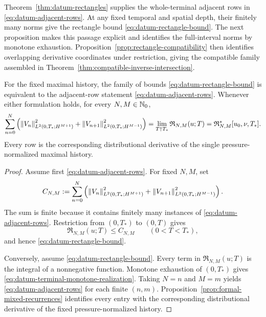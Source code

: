 Theorem~\ref{thm:datum-rectangles} supplies the whole-terminal adjacent
rows in \eqref{eq:datum-adjacent-rows}.  At any fixed temporal and spatial
depth, their finitely many norms give the rectangle bound
\eqref{eq:datum-rectangle-bound}.  The next proposition makes this passage
explicit and identifies the full-interval norms by monotone exhaustion.
Proposition~\ref{prop:rectangle-compatibility} then identifies overlapping
derivative coordinates under restriction, giving the compatible family
assembled in Theorem~\ref{thm:compatible-inverse-intersection}.

\begin{proposition}
\label{prop:datum-terminal-realization}
For the fixed maximal history, the family of bounds
\eqref{eq:datum-rectangle-bound} is equivalent to the adjacent-row statement
\eqref{eq:datum-adjacent-rows}.  Whenever either formulation holds, for every
\(N,M\in\mathbb N_0\),
\begin{equation}
 \sum_{n=0}^{N}\left(
 \left\lVert V_n\right\rVert_{L^2(0,T_*;H^{M+1})}^2
 +\left\lVert V_{n+1}\right\rVert_{L^2(0,T_*;H^{M-1})}^2
 \right)
 =\lim_{T\uparrow T_*}\mathfrak R_{N,M}(u;T)
 =\mathfrak R_{N,M}^*[u_0,\nu,T_*].
 \label{eq:datum-terminal-monotone-realization}
\end{equation}
Every row is the corresponding distributional derivative of the single
pressure-normalized maximal history.
\end{proposition}

\begin{proof}
Assume first \eqref{eq:datum-adjacent-rows}.  For fixed \(N,M\), set
\[
 C_{N,M}:=
 \sum_{n=0}^{N}\left(
  \left\lVert V_n\right\rVert_{L^2(0,T_*;H^{M+1})}^2
  +\left\lVert V_{n+1}\right\rVert_{L^2(0,T_*;H^{M-1})}^2
 \right).
\]
The sum is finite because it contains finitely many instances of
\eqref{eq:datum-adjacent-rows}.  Restriction from \((0,T_*)\) to \((0,T)\)
gives
\[
 \mathfrak R_{N,M}(u;T)\le C_{N,M}
 \qquad(0<T<T_*),
\]
and hence \eqref{eq:datum-rectangle-bound}.

Conversely, assume \eqref{eq:datum-rectangle-bound}.  Every term in
\(\mathfrak R_{N,M}(u;T)\) is the integral of a nonnegative function.
Monotone exhaustion of \((0,T_*)\) gives
\eqref{eq:datum-terminal-monotone-realization}.  Taking \(N=n\) and \(M=m\)
yields \eqref{eq:datum-adjacent-rows} for each finite \((n,m)\).
Proposition~\ref{prop:formal-mixed-recurrences} identifies every entry with
the corresponding distributional derivative of the fixed pressure-normalized
history.
\end{proof}

